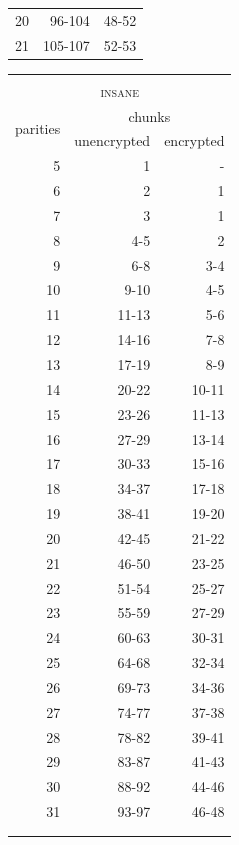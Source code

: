 \documentclass[manuscript,screen,review]{acmart}
\begin{document}
\begin{table}[!ht]
\begin{minipage}{.49\linewidth}
\begin{tabular}{|r|r|r|}
20 &96-104 & 48-52\\
21&105-107 & 52-53\\
\hline
\end{tabular}
\end{minipage}
\begin{minipage}{.49\linewidth}
\centering
\begin{tabular}{|r|r|r|}
\multicolumn{3}{c}{\textsc{}}\\
\multicolumn{3}{c}{\textsc{insane}}\\\hline
\multirow{2}{1.5cm}{\centering 
 parities } 
&\multicolumn{2}{|c|}{ chunks }\\\cline{2-3}
&\multicolumn{1}{|c|}{unencrypted} 
&\multicolumn{1}{|c|}{encrypted} \\\hline\hline
5 & 1     &-   \\
6 & 2     & 1\\
7 & 3     & 1\\ 
8 & 4-5   & 2\\ 
9 & 6-8   & 3-4\\
10 & 9-10  & 4-5\\
11 & 11-13 & 5-6\\
12 & 14-16 & 7-8\\
13 & 17-19 & 8-9\\
14 & 20-22 & 10-11\\
15 & 23-26 & 11-13\\
16 & 27-29 & 13-14\\
17 & 30-33 & 15-16\\
18 & 34-37 & 17-18\\
19 & 38-41 & 19-20\\
20 & 42-45 & 21-22\\
21 & 46-50 & 23-25\\
22 & 51-54 & 25-27\\
23 & 55-59 & 27-29\\
24 & 60-63 & 30-31\\
25 & 64-68 & 32-34\\
26 & 69-73 & 34-36\\
27 & 74-77 & 37-38\\
28 & 78-82 & 39-41\\
29 & 83-87 & 41-43\\
30 & 88-92 & 44-46\\
31 & 93-97 & 46-48\\
\hline
\multicolumn{3}{c}{}\\
\multicolumn{3}{c}{}
\end{tabular}
\end{minipage}
\label{tbl:parities}
\end{table}
\end{document}
